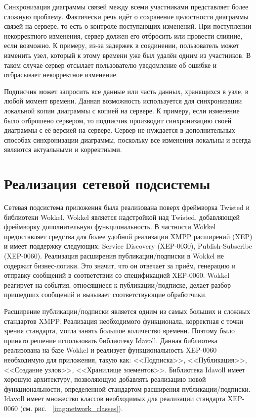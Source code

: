 Синхронизация диаграммы связей между всеми участниками представляет более
сложную проблему. Фактически речь идёт о сохранение целостности диаграммы связей
на сервере, то есть о контроле поступающих изменений. При поступлении
некорректного изменения, сервер должен его отбросить или провести слияние, если
возможно. К примеру, из-за задержек в соединении, пользователь может изменить
узел, который к этому времени уже был удалён одним из участников. В таком случае
сервер отсылает пользователю уведомление об ошибке и отбрасывает некорректное
изменение.

Подписчик может запросить все данные или часть данных, хранящихся в узле, в
любой момент времени. Данная возможность используется для синхронизации
локальной копии диаграммы с копией на сервере. К примеру, если изменение было
отброшено сервером, то подписчик производит синхронизацию своей диаграммы с её
версией на сервере. Сервер не нуждается в дополнительных способах синхронизации
диаграммы, поскольку все изменения локальны и всегда являются актуальными и
корректными.

\section{Реализация сетевой подсистемы}
Сетевая подсистема приложения была реализована поверх фреймворка Twisted и
библиотеки Wokkel. Wokkel является надстройкой над Twisted, добавляющей
фреймворку дополнительную функциональность. В частности Wokkel предоставляет
средства для более удобной реализации XMPP расширений (XEP) и имеет поддержку
следующих: Service Discovery (XEP-0030), Publish-Subscribe (XEP-0060).
Реализация расширения публикации/подписки в Wokkel не содержит бизнес-логики.
Это значит, что он отвечает за приём, генерацию и отправку сообщений в
соответствии со спецификацией XEP-0060. Wokkel реагирует на события, относящиеся
к публикации/подписке, делает разбор пришедших сообщений и вызывает
соответствующие обработчики.

Расширение публикации/подписки является одним из самых больших и сложных
стандартов XMPP. Реализация необходимого функционала, корректная с точки зрения
стандарта, могла занять большое количество времени. Поэтому было принято решение
использовать библиотеку Idavoll. Данная библиотека реализована на базе Wokkel и
реализует функциональность XEP-0060 необходимую для приложения, такую как:
<<Подписка>>, <<Публикация>>, <<Создание узлов>>, <<Хранилище элементов>>.
Библиотека Idavoll имеет хорошую архитектуру, позволяющую добавлять реализацию
новой функциональности, определенной стандартом расширения публикации/подписки.
Idavoll имеет множество классов необходимых для реализации стандарта XEP-0060
(см. рис. ~\ref{img:network_classes}).

